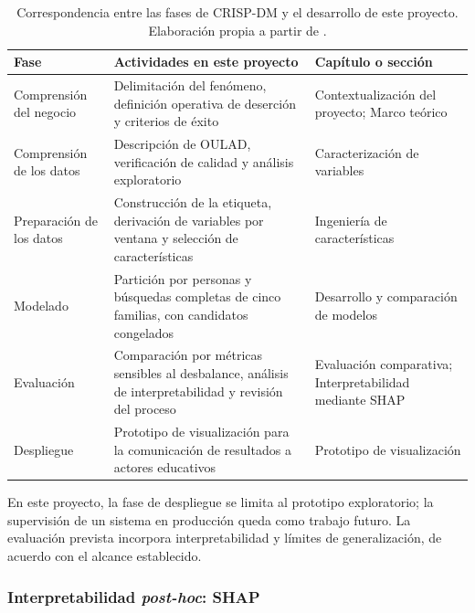 \begin{table}[htbp]
\centering
\caption[Correspondencia entre las fases de CRISP-DM y el desarrollo de este proyecto.]{Correspondencia entre las fases de CRISP-DM y el desarrollo de este proyecto. Elaboración propia a partir de \cite{chapman2000,martinezplumed2021}.}
\label{tab:crispdm-proyecto}
\small
\begin{tabular}{p{} p{} p{}}
\hline
\textbf{Fase} & \textbf{Actividades en este proyecto} & \textbf{Capítulo o sección} \\
\hline
Comprensión del negocio & Delimitación del fenómeno, definición operativa de deserción y criterios de éxito & Contextualización del proyecto; Marco teórico \\
Comprensión de los datos & Descripción de OULAD, verificación de calidad y análisis exploratorio & Caracterización de variables \\
Preparación de los datos & Construcción de la etiqueta, derivación de variables por ventana y selección de características & Ingeniería de características \\
Modelado & Partición por personas y búsquedas completas de cinco familias, con candidatos congelados & Desarrollo y comparación de modelos \\
Evaluación & Comparación por métricas sensibles al desbalance, análisis de interpretabilidad y revisión del proceso & Evaluación comparativa; Interpretabilidad mediante SHAP \\
Despliegue & Prototipo de visualización para la comunicación de resultados a actores educativos & Prototipo de visualización \\
\hline
\end{tabular}
\end{table}

En este proyecto, la fase de despliegue se limita al prototipo exploratorio; la supervisión de un sistema en producción queda como trabajo futuro. La evaluación prevista incorpora interpretabilidad y límites de generalización, de acuerdo con el alcance establecido.


\subsubsection{Interpretabilidad \textit{post-hoc}: SHAP}

